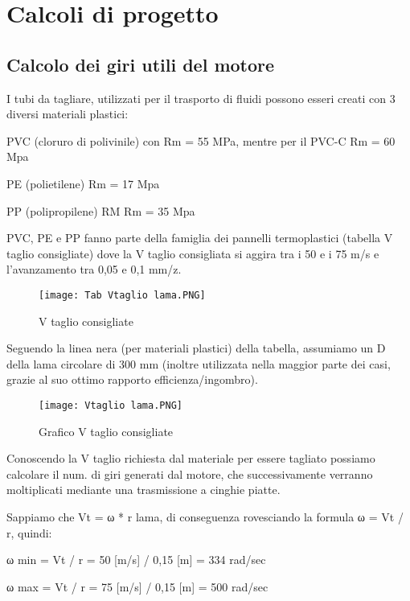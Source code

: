 \documentclass{report}
\begin{document}
\section{Calcoli di progetto}
\subsection{Calcolo dei giri utili del motore}

I tubi da tagliare, utilizzati per il trasporto di fluidi possono esseri creati con 3 diversi materiali plastici:

\begin{description}
\item PVC (cloruro di polivinile) con	Rm = 55 MPa, mentre per il PVC-C Rm = 60 Mpa
\item PE (polietilene) 			Rm = 17 Mpa
\item PP (polipropilene) RM		Rm = 35 Mpa
\end{description}

PVC, PE e PP fanno parte della famiglia dei pannelli termoplastici (tabella V taglio consigliate) dove la V taglio consigliata si aggira tra i 50 e i 75 m/s e l’avanzamento tra 0,05 e 0,1 mm/z.

\begin{figure}[H] %
    \centering
    \texttt{[image: Tab Vtaglio lama.PNG]}
    \caption{V taglio consigliate}
    \label{fig:my_label}
\end{figure}

Seguendo la linea nera (per materiali plastici) della tabella, assumiamo un D della lama circolare di 300 mm (inoltre utilizzata nella maggior parte dei casi, grazie al suo ottimo rapporto efficienza/ingombro).

\begin{figure}[H] %
    \centering
    \texttt{[image: Vtaglio lama.PNG]}
    \caption{Grafico V taglio consigliate}
    \label{fig:my_label}
\end{figure}

Conoscendo la V taglio richiesta dal materiale per essere tagliato possiamo calcolare il num. di giri generati dal motore, che successivamente verranno moltiplicati mediante una trasmissione a cinghie piatte.

Sappiamo che Vt = ω * r lama, di conseguenza rovesciando la formula ω = Vt / r, quindi:

\begin{description}
\item ω min = Vt / r = 50 [m/s] / 0,15 [m] = 334 rad/sec
\item ω max  = Vt / r = 75 [m/s] / 0,15 [m] = 500 rad/sec
\end{description}
\end{document}
